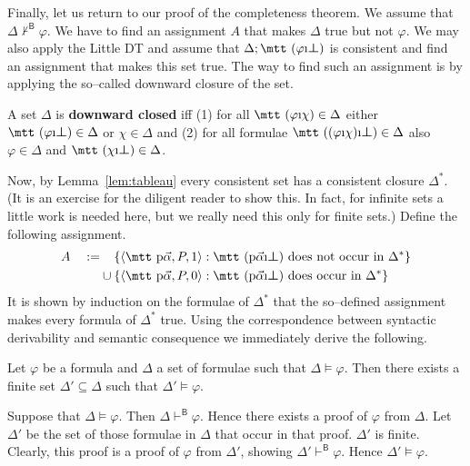 Finally, let us return to our proof of the completeness theorem.
We assume that $\Delta \nvdash^{\mathsf{B}} \varphi$. We have to
find an assignment $A$ that makes $\Delta$ true but not
$\varphi$. We may also apply the Little DT and assume that
$\Delta;\mbox{\mtt ($\varphi$\symbol{25}$\sbot$)}$ is consistent and
find an assignment that makes this set true. The way to find such
an assignment is by applying the so--called downward closure of
the set.
\begin{defn}
A set $\Delta$ is \textbf{downward closed} iff (1) for
all $\mbox{\mtt ($\varphi$\symbol{25}$\chi$)} \in \Delta$ either
$\mbox{\mtt ($\varphi$\symbol{25}$\sbot$)} \in \Delta$ or $\chi \in
\Delta$ and (2) for all formulae $\mbox{\mtt (($\varphi$\symbol{25}$\chi$%
)\symbol{25}$\sbot$)} \in \Delta$ also $\varphi \in \Delta$ and 
$\mbox{\mtt ($\chi$\symbol{25}$\sbot$)} \in \Delta$.
\end{defn}
Now, by Lemma~\ref{lem:tableau} every consistent set has a consistent
closure $\Delta^{\ast}$. (It is an exercise for the diligent reader
to show this. In fact, for infinite sets a little work is needed here,
but we really need this only for finite sets.) Define the following
assignment.
\begin{align}
A \quad := & \phantom{\mbox{}\cup\mbox{}}
    \{\auf \mbox{\mtt p}\vec{\alpha}, P, 1\zu :
    \text{\mtt (p$\vec{\alpha}$\symbol{25}$\sbot$)}
    \text{ does not occur in }\Delta^{\ast}\} \\\notag
        & \cup
    \{\auf \mbox{\mtt p}\vec{\alpha}, P, 0\zu :
    \text{\mtt (p$\vec{\alpha}$\symbol{25}$\sbot$)}
    \text{ does occur in }\Delta^{\ast}\}
\end{align}
It is shown by induction on the formulae of $\Delta^{\ast}$ that
the so--defined assignment makes every formula of $\Delta^{\ast}$
true. Using the correspondence between syntactic derivability
and semantic consequence we immediately derive the following.
\begin{thm}
Let $\varphi$ be a formula and $\Delta$ a set of formulae such
that $\Delta \vDash \varphi$. Then there exists a finite set $\Delta'
\subseteq \Delta$ such that $\Delta' \vDash \varphi$.
\end{thm}
\proofbeg 
Suppose that $\Delta \vDash \varphi$. Then $\Delta
\vdash^{\mathsf{B}} \varphi$. Hence there exists a proof of
$\varphi$ from $\Delta$. Let $\Delta'$ be the set of those
formulae in $\Delta$ that occur in that proof. $\Delta'$ is
finite. Clearly, this proof is a proof of $\varphi$ from
$\Delta'$, showing $\Delta' \vdash^{\mathsf{B}} \varphi$. Hence
$\Delta' \vDash \varphi$. 
\proofend

